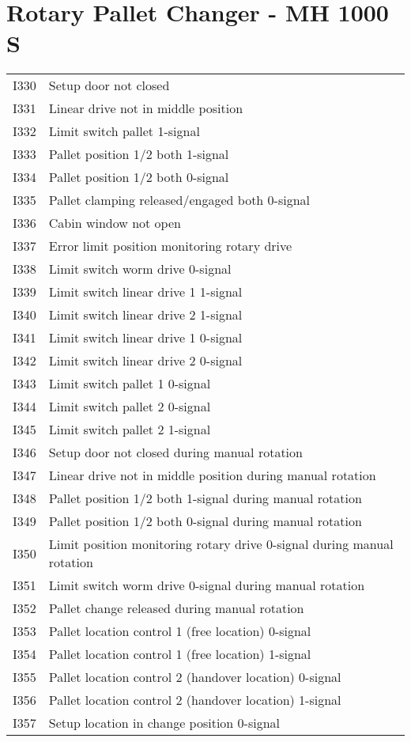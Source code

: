 \documentclass[openany,11pt]{book}
\begin{document}
\section*{Rotary Pallet Changer - MH 1000 S}

\begin{table}[!h]
    \begin{tabular}{ll}
    I330 & Setup door not closed \\
    I331 & Linear drive not in middle position \\
    I332 & Limit switch pallet 1-signal \\
    I333 & Pallet position 1/2 both 1-signal \\
    I334 & Pallet position 1/2 both 0-signal \\
    I335 & Pallet clamping released/engaged both 0-signal \\
    I336 & Cabin window not open \\
    I337 & Error limit position monitoring rotary drive \\
    I338 & Limit switch worm drive 0-signal \\
    I339 & Limit switch linear drive 1 1-signal \\
    I340 & Limit switch linear drive 2 1-signal \\
    I341 & Limit switch linear drive 1 0-signal \\
    I342 & Limit switch linear drive 2 0-signal \\
    I343 & Limit switch pallet 1 0-signal \\
    I344 & Limit switch pallet 2 0-signal \\
    I345 & Limit switch pallet 2 1-signal \\
    I346 & Setup door not closed during manual rotation \\
    I347 & Linear drive not in middle position during manual rotation \\
    I348 & Pallet position 1/2 both 1-signal during manual rotation \\
    I349 & Pallet position 1/2 both 0-signal during manual rotation \\
    I350 & Limit position monitoring rotary drive 0-signal during manual rotation \\
    I351 & Limit switch worm drive 0-signal during manual rotation \\
    I352 & Pallet change released during manual rotation \\
    I353 & Pallet location control 1 (free location) 0-signal \\
    I354 & Pallet location control 1 (free location) 1-signal \\
    I355 & Pallet location control 2 (handover location) 0-signal \\
    I356 & Pallet location control 2 (handover location) 1-signal \\
    I357 & Setup location in change position 0-signal \\
    \end{tabular}
\end{table}
\end{document}
